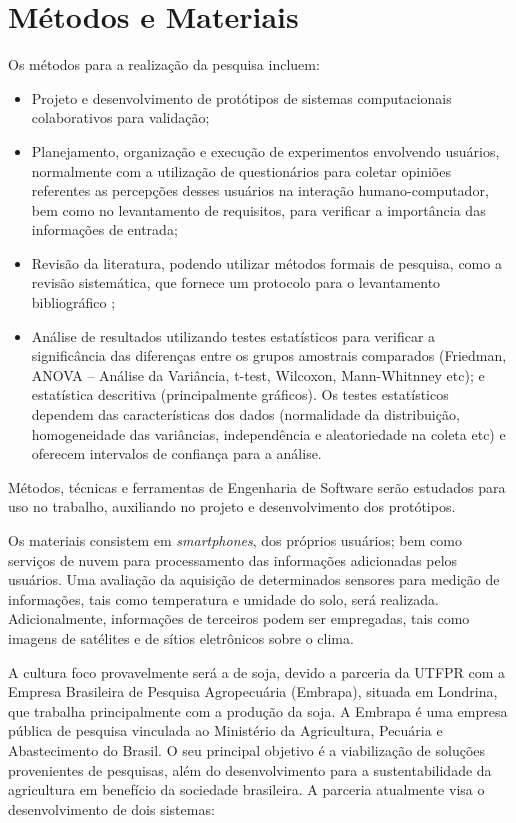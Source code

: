 \documentclass[12pt]{article}
\begin{document}
\section{Métodos e Materiais}
\label{sec:metodos_materiais}
		
Os métodos para a realização da pesquisa incluem:

\begin{itemize}
	\item Projeto e desenvolvimento de protótipos de sistemas computacionais colaborativos para validação;
	\item Planejamento, organização e execução de experimentos envolvendo usuários, normalmente com a utilização de questionários para coletar opiniões referentes as percepções desses usuários na interação humano-computador, bem como no levantamento de requisitos, para verificar a importância das informações de entrada;
	\item Revisão da literatura, podendo utilizar métodos formais de pesquisa, como a revisão sistemática, que fornece um protocolo para o levantamento bibliográfico \cite{Kitchenham:2004};
	\item Análise de resultados utilizando testes estatísticos para verificar a significância das diferenças entre os grupos amostrais comparados (Friedman, ANOVA – Análise da Variância, t-test, Wilcoxon, Mann-Whitnney etc); e estatística descritiva (principalmente gráficos). Os testes estatísticos dependem das características dos dados (normalidade da distribuição, homogeneidade das variâncias, independência e aleatoriedade na coleta etc) e oferecem intervalos de confiança para a análise.
\end{itemize}

Métodos, técnicas e ferramentas de Engenharia de Software serão estudados para uso no trabalho, auxiliando no projeto e desenvolvimento dos protótipos.

Os materiais consistem em \textit{smartphones}, dos próprios usuários; bem como serviços de nuvem para processamento das informações adicionadas pelos usuários. Uma avaliação da aquisição de determinados sensores para medição de informações, tais como temperatura e umidade do solo, será realizada. Adicionalmente, informações de terceiros podem ser empregadas, tais como imagens de satélites e de sítios eletrônicos sobre o clima. 		

A cultura foco provavelmente será a de soja, devido a parceria da UTFPR com a Empresa Brasileira de Pesquisa Agropecuária (Embrapa), situada em Londrina, que trabalha principalmente com a produção da soja. A Embrapa é uma empresa pública de pesquisa vinculada ao Ministério da Agricultura, Pecuária e Abastecimento do Brasil. O seu principal objetivo é a viabilização de soluções provenientes de pesquisas, além do desenvolvimento para a sustentabilidade da agricultura em benefício da sociedade brasileira. A parceria atualmente visa o desenvolvimento de dois sistemas:
\end{document}
